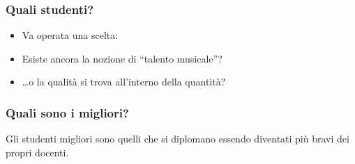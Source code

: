 \documentclass[compress,\mode]{beamer}
\begin{document}
\setcounter{ms}{0}

\begin{frame}

  \frametitle<+->{Quali studenti?}

  \begin{itemize}[<+- | alert@+>]

    \item Va operata una scelta: 

    \item Esiste ancora la nozione di ``talento musicale''?

    \item \ldots o la qualit\`a si trova all'interno della quantit\`a?

  \end{itemize}

\end{frame}

\begin{frame}

  \frametitle<+->{Quali sono i migliori?}

  \begin{center}
    Gli studenti migliori sono quelli che si diplomano
    essendo diventati pi\`u bravi dei propri docenti.
  \end{center}

\end{frame}
\end{document}
